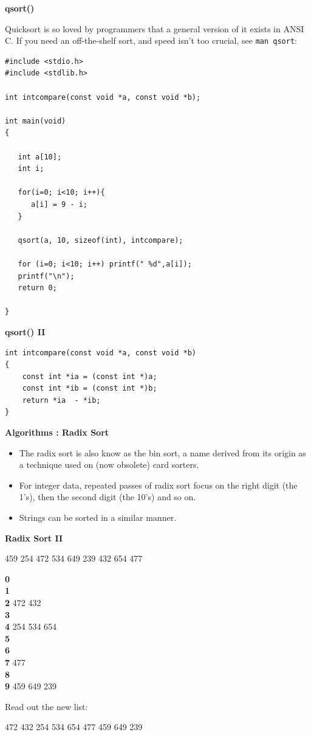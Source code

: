 \newpage
{\samepage
\begin{center}
{\Large{\bf qsort()}}
\end{center}
Quicksort is so loved by programmers that a general version of
it exists in ANSI C. If you need an off-the-shelf sort, and speed isn't
too crucial, see \verb^man qsort^:
\begin{verbatim}
#include <stdio.h>
#include <stdlib.h>

int intcompare(const void *a, const void *b);

int main(void)
{

   int a[10];
   int i;

   for(i=0; i<10; i++){
      a[i] = 9 - i;
   }

   qsort(a, 10, sizeof(int), intcompare);

   for (i=0; i<10; i++) printf(" %d",a[i]);
   printf("\n");
   return 0;

}
\end{verbatim}
}

\newpage
{\samepage
\begin{center}
{\Large{\bf qsort() II}}
\end{center}
\begin{verbatim}
int intcompare(const void *a, const void *b)
{
    const int *ia = (const int *)a;
    const int *ib = (const int *)b;
    return *ia  - *ib;
}
\end{verbatim}
}

\newpage
{\samepage
\begin{center}
{\Large{\bf Algorithms : Radix Sort}}
\end{center}
\begin{itemize}
\item The radix sort is also know as the bin sort, a name
derived from its origin as a technique used on (now obsolete)
card sorters.
\item For integer data, repeated passes of radix sort focus
on the right digit (the 1's), then the second digit (the 10's)
and so on.
\item Strings can be sorted in a similar manner.
\end{itemize}
}

\newpage
{\samepage
\begin{center}
{\Large{\bf Radix Sort II}}
\end{center}

459 254 472 534 649 239 432 654 477

{\bf 0}\\
{\bf 1}\\
{\bf 2} 472 432\\
{\bf 3}\\
{\bf 4} 254 534 654\\
{\bf 5}\\
{\bf 6}\\
{\bf 7} 477\\
{\bf 8}\\
{\bf 9} 459 649 239

Read out the new list:

472 432 254 534 654 477 459 649 239
}

